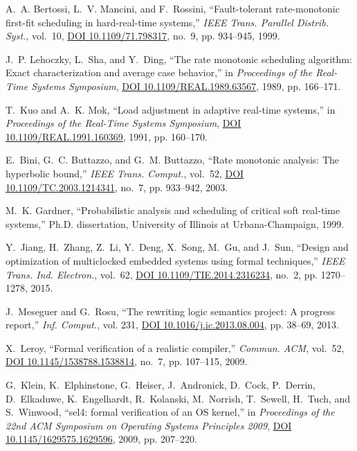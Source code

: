 \documentclass[journal]{IEEEtranTIE}
\begin{document}
\begin{thebibliography}{10}
A.~A. Bertossi, L.~V. Mancini, and F.~Rossini, ``Fault-tolerant rate-monotonic
  first-fit scheduling in hard-real-time systems,'' \emph{{IEEE} Trans.
  Parallel Distrib. Syst.}, vol.~10,
  \href{http://dx.doi.org/10.1109/71.798317}{DOI 10.1109/71.798317}, no.~9, pp.
  934--945, 1999.

J.~P. Lehoczky, L.~Sha, and Y.~Ding, ``The rate monotonic scheduling algorithm:
  Exact characterization and average case behavior,'' in \emph{Proceedings of
  the Real-Time Systems Symposium},
  \href{http://dx.doi.org/10.1109/REAL.1989.63567}{DOI
  10.1109/REAL.1989.63567}, 1989, pp. 166--171.

T.~Kuo and A.~K. Mok, ``Load adjustment in adaptive real-time systems,'' in
  \emph{Proceedings of the Real-Time Systems Symposium},
  \href{http://dx.doi.org/10.1109/REAL.1991.160369}{DOI
  10.1109/REAL.1991.160369}, 1991, pp. 160--170.

E.~Bini, G.~C. Buttazzo, and G.~M. Buttazzo, ``Rate monotonic analysis: The
  hyperbolic bound,'' \emph{{IEEE} Trans. Comput.}, vol.~52,
  \href{http://dx.doi.org/10.1109/TC.2003.1214341}{DOI
  10.1109/TC.2003.1214341}, no.~7, pp. 933--942, 2003.

M.~K. Gardner, ``Probabilistic analysis and scheduling of critical soft
  real-time systems,'' Ph.D. dissertation, University of Illinois at
  Urbana-Champaign, 1999.

Y.~Jiang, H.~Zhang, Z.~Li, Y.~Deng, X.~Song, M.~Gu, and J.~Sun, ``Design and
  optimization of multiclocked embedded systems using formal techniques,''
  \emph{{IEEE} Trans. Ind. Electron.}, vol.~62,
  \href{http://dx.doi.org/10.1109/TIE.2014.2316234}{DOI
  10.1109/TIE.2014.2316234}, no.~2, pp. 1270--1278, 2015.

J.~Meseguer and G.~Rosu, ``The rewriting logic semantics project: A progress
  report,'' \emph{Inf. Comput.}, vol. 231,
  \href{http://dx.doi.org/10.1016/j.ic.2013.08.004}{DOI
  10.1016/j.ic.2013.08.004}, pp. 38--69, 2013.

X.~Leroy, ``Formal verification of a realistic compiler,'' \emph{Commun.
  {ACM}}, vol.~52, \href{http://dx.doi.org/10.1145/1538788.1538814}{DOI
  10.1145/1538788.1538814}, no.~7, pp. 107--115, 2009.

G.~Klein, K.~Elphinstone, G.~Heiser, J.~Andronick, D.~Cock, P.~Derrin,
  D.~Elkaduwe, K.~Engelhardt, R.~Kolanski, M.~Norrish, T.~Sewell, H.~Tuch, and
  S.~Winwood, ``sel4: formal verification of an {OS} kernel,'' in
  \emph{Proceedings of the 22nd {ACM} Symposium on Operating Systems Principles
  2009}, \href{http://dx.doi.org/10.1145/1629575.1629596}{DOI
  10.1145/1629575.1629596}, 2009, pp. 207--220.


\end{thebibliography}
\end{document}
